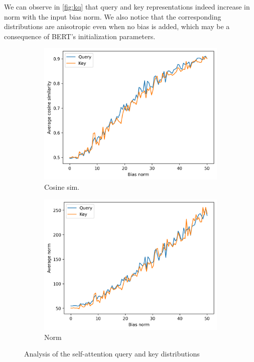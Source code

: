 We can observe in \autoref{fig:kq} that query and key representations indeed increase in norm with the input bias norm. We also notice that the corresponding distributions are anisotropic even when no bias is added, which may be a consequence of BERT's initialization parameters.

\begin{figure}[ht]
    \centering
    \begin{subfigure}[b]{0.48\columnwidth}
         \includegraphics[width=\linewidth]{sources/part_1/anisotropy/imgs/trained_bert_base_bias_vs_kq_cos.png}
         \caption{Cosine sim.}
         \label{fig:cos_qk_trained_transformer}
    \end{subfigure}
    \begin{subfigure}[b]{0.48\columnwidth}
         \includegraphics[width=\linewidth]{sources/part_1/anisotropy/imgs/trained_bert_base_bias_vs_kq_norm.png}
         \caption{Norm}
         \label{fig:norm_qk_trained_transformer}
    \end{subfigure}
    \caption{Analysis of the self-attention query and key distributions}
    \label{fig:kq}
\end{figure}

